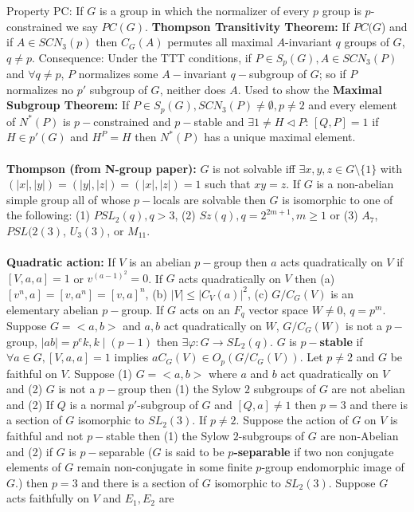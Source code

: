 Property PC: If $G$ is a group in which the normalizer of every $p$ group is
$p$-constrained we say $PC(G)$.
{\bf Thompson Transitivity Theorem:}  If $PC(G$) 
and if $A \in SCN_3(p)$ then $C_G(A)$ permutes all
maximal $A$-invariant $q$ groups of $G$, $q \ne p$. Consequence:
Under the TTT conditions, if $P \in S_p(G), A \in SCN_3(P)$ and $\forall q \ne p$,
$P$ normalizes some $A-$invariant $q-$subgroup of $G$; so if $P$ normalizes no
$p'$ subgroup of $G$, neither does $A$.  Used to show the 
{\bf Maximal Subgroup Theorem:}
If $P \in S_p(G), SCN_3(P) \ne \emptyset, p \ne 2$ and every element of $N^*(P)$
is $p-$constrained and $p-$stable and $\exists 1 \ne H \lhd P$: $[Q,P]=1$ if $H \in p'(G)$
and $H^P=H$ then $N^*(P)$ has a unique maximal element.\\
\\
{\bf Thompson (from N-group paper):} $G$ is not solvable iff 
$\exists x, y, z \in G \setminus \{1\}$
with $(|x|, |y|)=(|y|,|z|)=(|x|,|z|)=1$ such that $xy=z$.  If $G$ is a non-abelian
simple group all of whose $p-$locals are solvable then $G$ is isomorphic to one
of the following: (1) $PSL_2 (q), q>3$, (2) $Sz(q), q= 2^{2m+1}, m \ge 1$ or (3)
$A_7$, $PSL(2(3)$, $U_3(3)$, or $M_{11}$.\\
\\
{\bf Quadratic action:}
If $V$ is an abelian $p-$group then $a$ acts quadratically on $V$ if $[V,a,a]=1$ or
$v^{(a-1)^2}=0$.  If $G$ acts quadratically on $V$ then (a) $[v^n,a]=[v,a^n]=[v,a]^n$,
(b) $|V| \le |C_V(a)|^2$, (c) $G/C_G(V)$ is an elementary abelian $p-$group.
If $G$ acts on an $F_q$ vector space $W \ne 0$, $q=p^m$.  Suppose $G=<a,b>$ and
$a,b$ act quadratically on $W$, $G/C_G(W)$ is not a $p-$group, $|ab|=p^ek, k \mid (p-1)$
then $\exists \varphi: G \rightarrow SL_2(q)$.  $G$ is {\bf $p-$stable} if $\forall a \in G,
[V,a,a]=1$ implies $a C_G(V) \in O_p ( G/C_G(V))$.  Let $p \ne 2$ and $G$ be faithful on $V$.
Suppose (1) $G=<a,b>$ where $a$ and $b$ act quadratically on $V$ and
(2) $G$ is not a $p-$group then (1) the Sylow $2$ subgroups of $G$ are not abelian and
(2) If $Q$ is a normal $p'$-subgroup of $G$ and $[Q,a] \ne 1$ then $p=3$ and there
is a section of $G$ isomorphic to $SL_2(3)$.  If $p \ne 2$.  Suppose the action of
$G$ on $V$ is faithful and not $p-$stable then (1) the Sylow $2$-subgroups of
$G$ are non-Abelian and (2) if $G$ is $p-$separable ($G$ is said to be 
{\bf $p$-separable} if two non conjugate elements of $G$ remain non-conjugate in 
some finite $p$-group endomorphic image of $G$.) 
then $p=3$ and there is a section of
$G$ isomorphic to $SL_2(3)$.  Suppose $G$ acts faithfully on $V$ and $E_1 , E_2$ are
